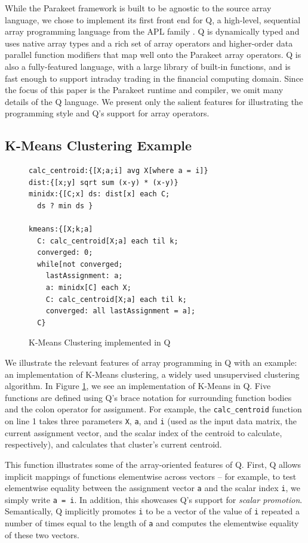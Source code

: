 \documentclass[preprint]{sigplanconf}
\begin{document}
While the Parakeet framework is built to be agnostic to the source array language, we chose to implement its first front end for Q, a high-level, sequential array programming language from the APL family \cite{Borr08}. Q is dynamically typed and uses native array types and a rich set of array operators and higher-order data parallel function modifiers that map well onto the Parakeet array operators. Q is also a fully-featured language, with a large library of built-in functions, and is fast enough to support
intraday trading in the financial computing domain. Since the focus of this paper is the Parakeet runtime and compiler, we omit many details of the Q language.  We present only the salient features for illustrating the programming style and Q's support for array operators.

\subsection{K-Means Clustering Example}
\begin{figure}[h!]
\begin{lstlisting}
calc_centroid:{[X;a;i] avg X[where a = i]}
dist:{[x;y] sqrt sum (x-y) * (x-y)}
minidx:{[C;x] ds: dist[x] each C; 
  ds ? min ds }

kmeans:{[X;k;a]
  C: calc_centroid[X;a] each til k;
  converged: 0;
  while[not converged;
    lastAssignment: a;
    a: minidx[C] each X;
    C: calc_centroid[X;a] each til k;
    converged: all lastAssignment = a];
  C}
\end{lstlisting}
\caption{K-Means Clustering implemented in Q}
\label{QKMeans}
\end{figure}

We illustrate the relevant features of array programming in Q with an example: an implementation of K-Means clustering, a widely used unsupervised clustering algorithm.  In Figure \ref{QKMeans}, we see an implementation of K-Means in Q.  Five functions are defined using Q's brace notation for surrounding function bodies and the colon operator for assignment. For example, the \texttt{calc\_centroid} function on line 1 takes three parameters \texttt{X}, \texttt{a}, and \texttt{i} (used as the input data matrix, the
current assignment vector, and the scalar index of the centroid to calculate, respectively), and calculates that cluster's current centroid.

This function illustrates some of the array-oriented features of Q. First, Q allows implicit mappings of functions elementwise across vectors -- for example, to test elementwise equality between the assignment
vector \texttt{a} and the scalar index \texttt{i}, we simply write \texttt{a = i}.  In addition, this showcases Q's support for \emph{scalar promotion}.  Semantically, Q implicitly promotes \texttt{i} to be a vector of the value of \texttt{i} repeated a number of times equal to the length of \texttt{a} and computes the elementwise equality of these two vectors.
\end{document}
